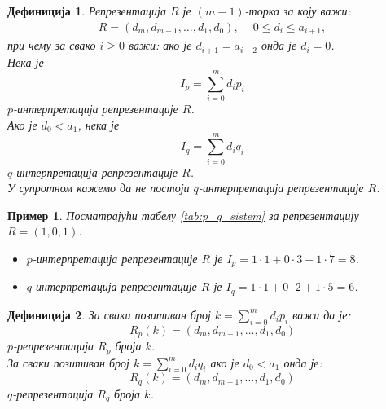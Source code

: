 \documentclass[a4paper]{article}
\newtheorem{example}{Пример}
\newtheorem{definition}{Дефиниција}
\begin{document}
\begin{definition}
	Репрезентација $ R $ је  $ (m+1) $-торка за коју важи:
		\begin{eqnarray}
			R = (d_{m}, d_{m-1}, \ldots , d_{1}, d_{0}), \quad \ 0 \le d_{i} \le a_{i+1},
		\end{eqnarray}
	при чему за свако $ i \ge 0 $ важи: ако је $ d_{i+1} = a_{i+2} $ онда је $ d_{i} = 0 $.\\
	Нека је 
		\begin{displaymath}
			I_{p} = \sum_{i=0}^{m} d_{i}p_{i}
		\end{displaymath} 		
	$ p $-интерпретација репрезентације $ R $.\\ 
	Ако је $ d_{0} < a_{1} $, нека је 
		\begin{displaymath}
			I_{q} = \sum_{i=0}^{m} d_{i}q_{i}
		\end{displaymath}  
	$ q $-интерпретација репрезентације $ R $.\\ 
	У супротном кажемо да не постоји $ q $-интерпретација репрезентације $ R $.
\end{definition}

\begin{example}
	Посматрајући табелу \ref{tab:p_q_sistem} за репрезентацију $ R = (1, 0, 1) $: 
	\begin{itemize}
		\item $ p $-интерпретација репрезентације $ R $ је $ I_{p} = 1 \cdot 1 + 0 \cdot 3 + 1 \cdot 7 = 8 $.
		\item $ q $-интерпретација репрезентације $ R $ је $ I_{q} = 1 \cdot 1 + 0 \cdot 2 + 1 \cdot 5 = 6 $.
	\end{itemize}
\end{example}

\begin{definition}
	За сваки позитиван број $ k = \sum_{i=0}^{m} d_{i}p_{i} $ важи да је: 	
		\begin{displaymath}
			R_{p}(k) = (d_{m}, d_{m-1}, \ldots , d_{1}, d_{0})
		\end{displaymath}	
	$ p $-репрезентација $ R_{p} $ броја $ k $.\\
	За сваки позитиван број $ k = \sum_{i=0}^{m} d_{i}q_{i} $ ако је $ d_{0} < a_{1} $ онда је:	
		\begin{displaymath}
			R_{q}(k) = (d_{m}, d_{m-1}, \ldots , d_{1}, d_{0})
		\end{displaymath}	
	 $ q $-репрезентација $ R_{q} $ броја $ k $.
\end{definition}
\end{document}
